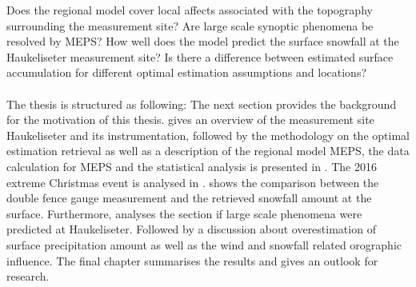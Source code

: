 Does the regional model cover local affects associated with the topography surrounding the measurement site?
Are large scale synoptic phenomena be resolved by MEPS?
How well does the model predict the surface snowfall at the Haukeliseter measurement site? Is there a difference between estimated surface accumulation for different optimal estimation assumptions and locations? 
\\
\\
The thesis is structured as following: The next section provides the background for the motivation of this thesis.
 gives an overview of the measurement site Haukeliseter and its instrumentation, followed by the methodology on the optimal estimation retrieval as well as a description of the regional model MEPS, the data calculation for MEPS and the statistical analysis is presented in .
The 2016 extreme Christmas event is analysed in .  shows the comparison between the double fence gauge measurement and the retrieved snowfall amount at the surface. Furthermore, analyses the section if large scale phenomena were predicted at Haukeliseter. Followed by a discussion about overestimation of surface precipitation amount as well as the wind and snowfall related orographic influence.
The final chapter summarises the results and gives an outlook for research.
